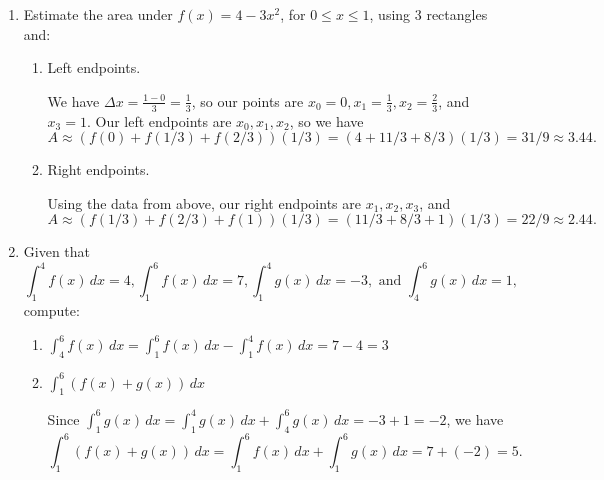 \documentclass[12pt]{article}
\newcommand{\points}[1]{\marginpar{\hspace{24pt}[#1]}}
\newcommand{\di}{\displaystyle}
\begin{document}
\begin{enumerate}
  \item Estimate the area under $f(x) = 4-3x^2$, for $0\leq x\leq 1$, using 3 rectangles and:
  \begin{enumerate}
  \item Left endpoints. \points{3}
  
 \medskip
 
 We have $\Delta x= \frac{1-0}{3} = \frac{1}{3}$, so our points are $x_0=0, x_1=\frac{1}{3}, x_2=\frac{2}{3}$, and $x_3 = 1$. Our left endpoints are $x_0, x_1, x_2$, so we have
 \[
 A\approx (f(0)+f(1/3)+f(2/3))(1/3) = (4+11/3+8/3)(1/3)=31/9 \approx 3.44.
 \]
  
  \item Right endpoints. \points {3}
  
  Using the data from above, our right endpoints are $x_1,x_2, x_3$, and
  \[
  A\approx (f(1/3)+f(2/3)+f(1))(1/3) = (11/3+8/3+1)(1/3) = 22/9\approx 2.44.
  \]
  
  \end{enumerate}

\item Given that 
\[
\int_1^4 f(x)\,dx = 4, \int_1^6 f(x)\,dx = 7, \int_1^4 g(x)\,dx = -3, \text{ and } \int_4^6 g(x)\,dx = 1,
\]
compute:
\begin{enumerate}
\item $\di \int_4^6 f(x)\,dx = \int_1^6f(x)\,dx - \int_1^4 f(x)\,dx = 7-4=3$\points{2}



\item $\di \int_1^6 (f(x)+g(x))\,dx$ \points{2}

Since $\di \int_1^6g(x)\,dx=\int_1^4g(x)\,dx+\int_4^6g(x)\,dx = -3+1=-2$, we have
\[
\int_1^6 (f(x)+g(x))\,dx = \int_1^6 f(x)\,dx+\int_1^6 g(x)\,dx = 7+(-2)=5.
\]
\end{enumerate}
\end{enumerate}
\end{document}

